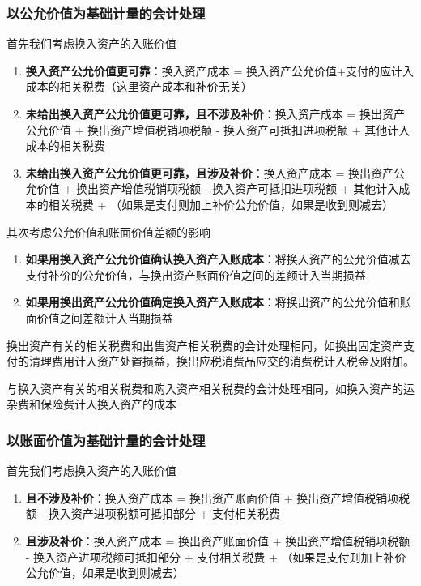 \documentclass[UTF8,12pt]{ctexart}
\numberwithin{equation}{section} %
\numberwithin{figure}{section}
\numberwithin{table}{section}
\begin{document}
	\subsubsection{以公允价值为基础计量的会计处理}
	首先我们考虑换入资产的入账价值
	\begin{enumerate}
		\item \textbf{换入资产公允价值更可靠}：换入资产成本 = 换入资产公允价值+支付的应计入成本的相关税费（这里资产成本和补价无关）
		
		\item \textbf{未给出换入资产公允价值更可靠，且不涉及补价}：换入资产成本 = 换出资产公允价值 + 换出资产增值税销项税额 - 换入资产可抵扣进项税额 + 其他计入成本的相关税费
		
		\item \textbf{未给出换入资产公允价值更可靠，且涉及补价}：换入资产成本 = 换出资产公允价值 + 换出资产增值税销项税额 - 换入资产可抵扣进项税额 + 其他计入成本的相关税费 + （如果是支付则加上补价公允价值，如果是收到则减去）
	\end{enumerate}
	
	其次考虑公允价值和账面价值差额的影响
	\begin{enumerate}
		\item \textbf{如果用换入资产公允价值确认换入资产入账成本}：将换入资产的公允价值减去支付补价的公允价值，与换出资产账面价值之间的差额计入当期损益
		
		\item \textbf{如果用换出资产公允价值确定换入资产入账成本}：将换出资产的公允价值和账面价值之间差额计入当期损益
	\end{enumerate}
	
	换出资产有关的相关税费和出售资产相关税费的会计处理相同，如换出固定资产支付的清理费用计入资产处置损益，换出应税消费品应交的消费税计入税金及附加。
	
	与换入资产有关的相关税费和购入资产相关税费的会计处理相同，如换入资产的运杂费和保险费计入换入资产的成本
	
	\subsubsection{以账面价值为基础计量的会计处理}
	首先我们考虑换入资产的入账价值
	\begin{enumerate}
		\item \textbf{且不涉及补价}：换入资产成本 = 换出资产账面价值 + 换出资产增值税销项税额 - 换入资产进项税额可抵扣部分 + 支付相关税费
		
		\item \textbf{且涉及补价}：换入资产成本 = 换出资产账面价值 + 换出资产增值税销项税额 - 换入资产进项税额可抵扣部分 + 支付相关税费 + （如果是支付则加上补价公允价值，如果是收到则减去）
	\end{enumerate}
	
\end{document}
